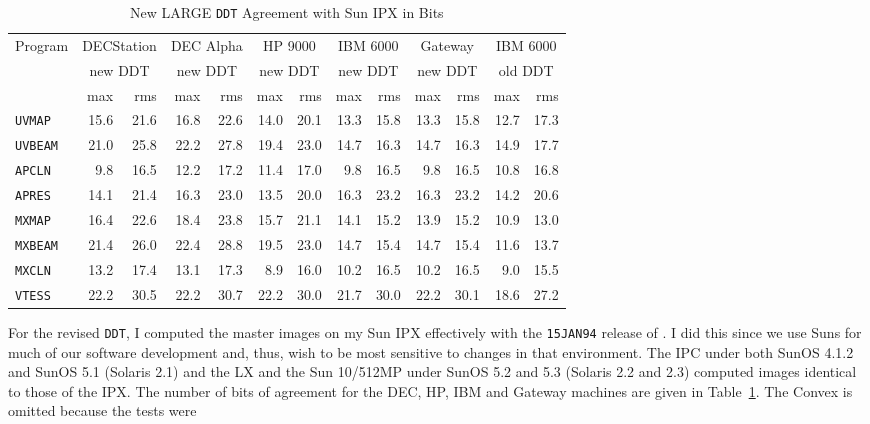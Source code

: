\begin{table}
\protect\begin{center}
\protect\begin{tabular}{|l|rr|rr|rr|rr|rr|rr|} \hline
  Program &
     \multicolumn{2}{c|}{DECStation} &
     \multicolumn{2}{c|}{DEC Alpha} &
     \multicolumn{2}{c|}{HP 9000} &
     \multicolumn{2}{c|}{IBM 6000} &
     \multicolumn{2}{c|}{Gateway} &
     \multicolumn{2}{c|}{IBM 6000}\\
  &  \multicolumn{2}{c|}{new DDT} &
     \multicolumn{2}{c|}{new DDT} &
     \multicolumn{2}{c|}{new DDT} &
     \multicolumn{2}{c|}{new DDT} &
     \multicolumn{2}{c|}{new DDT} &
     \multicolumn{2}{c|}{old DDT}\\
   & max & rms &
     max & rms &
     max & rms &
     max & rms &
     max & rms &
     max & rms \\ \hline
{\tt UVMAP} &15.6&21.6&16.8&22.6&14.0&20.1&13.3&15.8&13.3&15.8&12.7&17.3 \\
{\tt UVBEAM}&21.0&25.8&22.2&27.8&19.4&23.0&14.7&16.3&14.7&16.3&14.9&17.7 \\
{\tt APCLN} & 9.8&16.5&12.2&17.2&11.4&17.0& 9.8&16.5& 9.8&16.5&10.8&16.8 \\
{\tt APRES} &14.1&21.4&16.3&23.0&13.5&20.0&16.3&23.2&16.3&23.2&14.2&20.6 \\
{\tt MXMAP} &16.4&22.6&18.4&23.8&15.7&21.1&14.1&15.2&13.9&15.2&10.9&13.0 \\
{\tt MXBEAM}&21.4&26.0&22.4&28.8&19.5&23.0&14.7&15.4&14.7&15.4&11.6&13.7 \\
{\tt MXCLN} &13.2&17.4&13.1&17.3& 8.9&16.0&10.2&16.5&10.2&16.5& 9.0&15.5 \\
{\tt VTESS} &22.2&30.5&22.2&30.7&22.2&30.0&21.7&30.0&22.2&30.1&18.6&27.2 \\
\hline
\end{tabular}
\end{center}
\caption{New LARGE {\tt DDT} Agreement with Sun IPX in Bits}
\label{ta:newBits}
\end{table}
For the revised {\tt DDT}, I computed the master images on my Sun IPX
effectively with the {\tt 15JAN94} release of \AIPS.  I did this since
we use Suns for much of our software development and, thus, wish to be
most sensitive to changes in that environment.  The IPC under both
SunOS 4.1.2 and SunOS 5.1 (Solaris 2.1) and the LX and the Sun
10/512MP under SunOS 5.2 and 5.3 (Solaris 2.2 and 2.3) computed images
identical to those of the IPX.  The number of bits of agreement for
the DEC, HP, IBM and Gateway machines are given in
Table~\ref{ta:newBits}.  The Convex is omitted because the tests were
